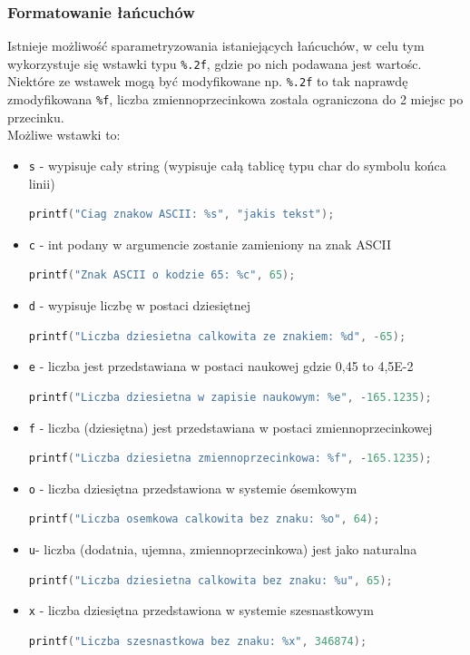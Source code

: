 \documentclass[a4paper,12pt,oneside]{book}
\begin{document}
				\subsubsection{Formatowanie łańcuchów}
					Istnieje możliwość sparametryzowania istaniejących łańcuchów, w celu tym wykorzystuje się wstawki typu \verb*|%.2f|, gdzie po nich podawana jest wartośc. Niektóre ze wstawek mogą być modyfikowane np. \verb*|%.2f| to tak naprawdę zmodyfikowana \verb*|%f|, liczba zmiennoprzecinkowa zostala ograniczona do 2 miejsc po przecinku.\\
					
					Możliwe wstawki to:
					\begin{itemize}
						\item \verb*|s| - wypisuje cały string (wypisuje całą tablicę typu char do symbolu końca linii)
						\begin{lstlisting}[language=C]
printf("Ciag znakow ASCII: %s", "jakis tekst"); 
						\end{lstlisting}
						\item \verb*|c| - int podany w argumencie zostanie zamieniony na znak ASCII
						\begin{lstlisting}[language=C]
printf("Znak ASCII o kodzie 65: %c", 65);
						\end{lstlisting}
						\item \verb*|d| - wypisuje liczbę w postaci dziesiętnej
						\begin{lstlisting}[language=C]
printf("Liczba dziesietna calkowita ze znakiem: %d", -65); 
						\end{lstlisting}
						\item \verb*|e| - liczba jest przedstawiana w postaci naukowej gdzie 0,45 to 4,5E-2
						\begin{lstlisting}[language=C]
printf("Liczba dziesietna w zapisie naukowym: %e", -165.1235); 
						\end{lstlisting}
						\item \verb*|f| - liczba (dziesiętna) jest przedstawiana w postaci zmiennoprzecinkowej
						\begin{lstlisting}[language=C]
printf("Liczba dziesietna zmiennoprzecinkowa: %f", -165.1235);
						\end{lstlisting}
						\item \verb*|o| -  liczba dziesiętna przedstawiona w systemie ósemkowym
						\begin{lstlisting}[language=C]
printf("Liczba osemkowa calkowita bez znaku: %o", 64); 
						\end{lstlisting}
						\item \verb*|u|- liczba (dodatnia, ujemna, zmiennoprzecinkowa) jest jako naturalna
						\begin{lstlisting}[language=C]
printf("Liczba dziesietna calkowita bez znaku: %u", 65);
						\end{lstlisting}
						\item \verb*|x| - liczba dziesiętna przedstawiona w systemie szesnastkowym
						\begin{lstlisting}[language=C]
printf("Liczba szesnastkowa bez znaku: %x", 346874); 
						\end{lstlisting}
					\end{itemize}
					
\end{document}

